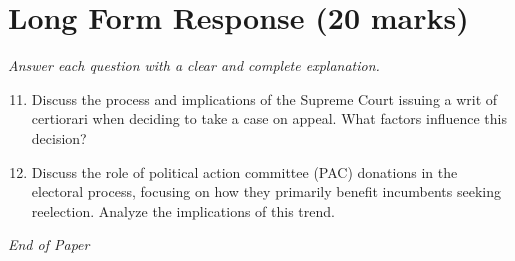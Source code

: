 \documentclass[12pt]{article}
\begin{document}
\section*{Long Form Response (20 marks)}
\textit{Answer each question with a clear and complete explanation.}
\begin{enumerate}[label=\arabic*.]
\setcounter{enumi}{10}
\item Discuss the process and implications of the Supreme Court issuing a writ of certiorari when deciding to take a case on appeal. What factors influence this decision?
\item Discuss the role of political action committee (PAC) donations in the electoral process, focusing on how they primarily benefit incumbents seeking reelection. Analyze the implications of this trend.
\end{enumerate}

\vfill
\noindent\textit{End of Paper}
\end{document}
